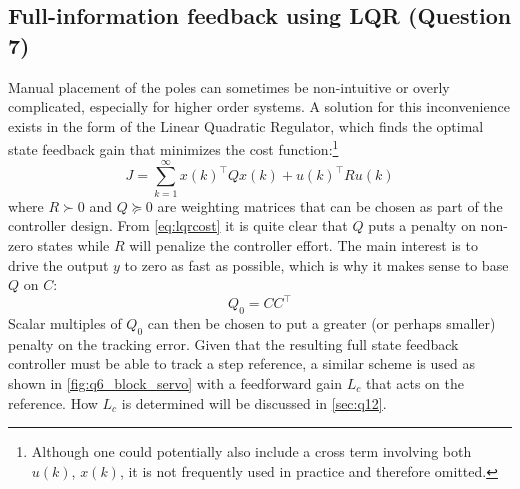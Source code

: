 \subsection{Full-information feedback using LQR \textnormal{\phantom{xxx}(Question 7)}}
\label{sec:ss_lqr}
Manual placement of the poles can sometimes be non-intuitive or overly complicated, especially for higher order systems. A solution for this inconvenience exists in the form of the Linear Quadratic Regulator, which finds the optimal state feedback gain that minimizes the cost function:\footnote{Although one could potentially also include a cross term involving both $u(k)$, $x(k)$, it is not frequently used in practice and therefore omitted.}
\begin{equation}
    J = \sum^\infty_{k=1} x(k)^\top Q x(k) + u(k)^\top R u(k)
    \label{eq:lqrcost}
\end{equation}
where $R\succ 0$ and $Q \succeq 0$ are weighting matrices that can be chosen as part of the controller design. From \cref{eq:lqrcost} it is quite clear that $Q$ puts a penalty on non-zero states while $R$ will penalize the controller effort. The main interest is to drive the output $y$ to zero as fast as possible, which is why it makes sense to base $Q$ on $C$:
                $$ Q_0 = CC^\top $$
Scalar multiples of $Q_0$ can then be chosen to put a greater (or perhaps smaller) penalty on the tracking error. Given that the resulting full state feedback controller must be able to track a step reference, a similar scheme is used as shown in \cref{fig:q6_block_servo} with a feedforward gain $L_c$ that acts on the reference. How $L_c$ is determined will be discussed in \cref{sec:q12}. 

